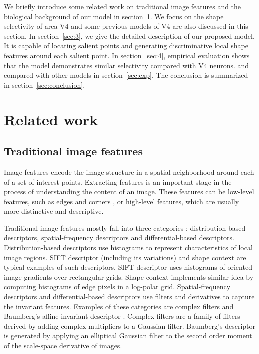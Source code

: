 \documentclass[5p]{elsarticle}
\begin{document}
We briefly introduce some related work on traditional image features
and the biological background of our model in section~\ref{sec:2}.
We focus on the shape selectivity of area V4 and some previous models of V4 are also discussed in this section.
In section~\ref{sec:3}, we give the detailed description of our proposed model.
It is capable of locating salient points 
and generating discriminative local shape features around each salient point.
In section~\ref{sec:4}, empirical evaluation shows that
the model demonstrates similar selectivity compared with V4 neurons.
and compared with other models in section~\ref{sec:exp}. 
The conclusion is summarized in section~\ref{sec:conclusion}.

\section{Related work}\label{sec:2}

\subsection{Traditional image features}

Image features encode the image structure in a spatial neighborhood around each of a set of interest points.
Extracting features is an important stage in the process of understanding the content of an image.
These features can be low-level features, such as edges \cite{canny1986} 
and corners \cite{harris1988,smith1997},
or high-level features, which are usually more distinctive and descriptive.

Traditional image features mostly fall into three categories \cite{mikolajczyk2005}: 
distribution-based descriptors, spatial-frequency descriptors and differential-based descriptors.
Distribution-based descriptors use histograms 
to represent characteristics of local image regions.
SIFT descriptor \cite{lowe1999} (including its variations) 
and shape context \cite{belongie2002} are typical examples of such descriptors.
SIFT descriptor uses histograms 
of oriented image gradients over rectangular grids.
Shape context implements similar idea 
by computing histograms of edge pixels in a log-polar grid.
Spatial-frequency descriptors and differential-based descriptors 
use filters and derivatives to capture the invariant features. 
Examples of these categories are 
complex filters \cite{schaffalitzky2002} 
and Baumberg's affine invariant descriptor \cite{baumberg2000}.
Complex filters are a family of filters 
derived by adding complex multipliers to a Gaussian filter.
Baumberg's descriptor is generated 
by applying an elliptical Gaussian filter 
to the second order moment 
of the scale-space derivative \cite{lindeberg1993} of images.
\end{document}
